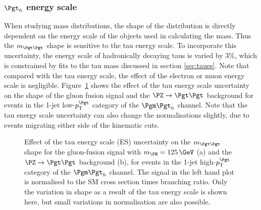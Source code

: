 \subsubsection{$\Pgth$ energy scale} 
When studying mass distributions, the shape of the distribution is directly
dependent on the energy scale of the objects used in calculating the mass. Thus the
$m_{\Pgt\Pgt}$ shape is sensitive to the tau energy scale.
To incorporate this uncertainty, the energy scale of hadronically decaying taus is varied by $3\%$,
which is constrained by fits to the tau mass discussed in section
\ref{sec:taues}. Note that compared with the tau energy scale, the effect of the
electron or muon energy scale is negligible. Figure~\ref{fig:tauessvfit} shows the
effect of the tau energy scale uncertainty on the shape of the gluon fusion signal and the
$\PZ\to\Pgt\Pgt$ background for events in the 1-jet low-$\pt^{\Pgt}$ category of
the $\mutau$ channel. Note that the tau energy scale uncertainty can also change
the normalisations slightly, due to events migrating either side of the
kinematic cuts.

\begin{figure}
\begin{center}

\end{center}
\caption[Effect of the tau energy scale uncertainty on the $m_{\Pgt\Pgt}$ shape for
the gluon-fusion signal with $m_{\PH}=125\,\GeV$ (a) and the $\ZToTauTau$ background (b).]{
Effect of the tau energy scale (ES) uncertainty on the $m_{\Pgt\Pgt}$ shape for
the gluon-fusion signal with $m_{\PH}=125\,\GeV$ (a) and the $\ZToTauTau$
background (b), for events in the 1-jet high-$\pt^{\Pgt}$ category of
the $\mutau$ channel. The signal in the left hand plot is normalised to the
\ac{SM} cross section times branching ratio. Only the variation in shape as a
result of the tau energy scale is shown here, but small variations in
normalisation are also possible.}
\label{fig:tauessvfit}
\end{figure} 

